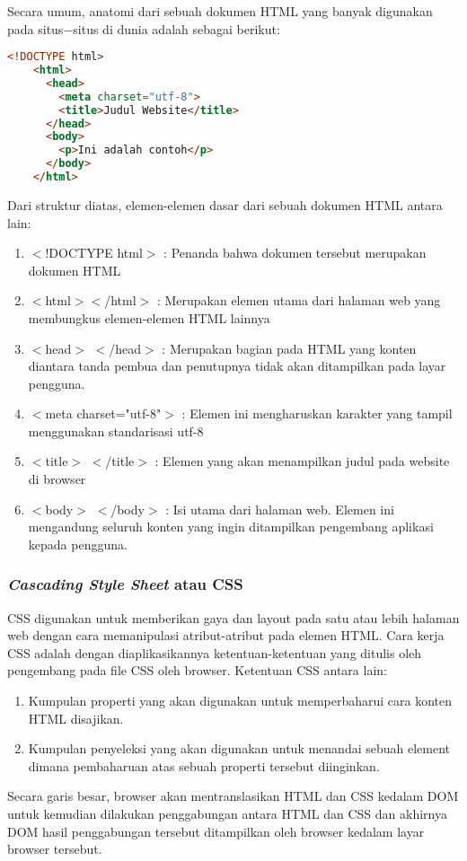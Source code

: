 \documentclass[pi.tex]{subfile}
\begin{document}
\hspace{10pt}Secara umum, anatomi dari sebuah dokumen HTML yang banyak digunakan pada situs$-$situs di dunia adalah sebagai berikut:\\
  \begin{lstlisting}[language=HTML]
    <!DOCTYPE html>
    <html>
      <head>
        <meta charset="utf-8">
        <title>Judul Website</title>
      </head>
      <body>
        <p>Ini adalah contoh</p>
      </body>
    </html>
  \end{lstlisting}
Dari struktur diatas, elemen-elemen dasar dari sebuah dokumen HTML antara lain:
\begin{enumerate}[leftmargin=1.65cm]
\item $<$!DOCTYPE html$>$ : Penanda bahwa dokumen tersebut merupakan dokumen HTML
\item $<$html$>$$<$/html$>$ : Merupakan elemen utama dari halaman web yang membungkus elemen-elemen HTML lainnya
\item $<$head$>$ $<$/head$>$ : Merupakan bagian pada HTML yang konten diantara tanda pembua dan penutupnya tidak akan ditampilkan pada layar pengguna.
\item $<$meta charset="utf-8"$>$ : Elemen ini mengharuskan karakter yang tampil menggunakan standarisasi utf-8
\item $<$title$>$ $<$/title$>$ : Elemen yang akan menampilkan judul pada website di browser
  \item $<$body$>$ $<$/body$>$ : Isi utama dari halaman web. Elemen ini mengandung seluruh konten yang ingin ditampilkan pengembang aplikasi kepada pengguna.
\end{enumerate}

\subsubsection{\emph{Cascading Style Sheet} atau CSS}\hspace{10pt}
CSS digunakan untuk memberikan gaya dan layout pada satu atau lebih halaman web dengan cara memanipulasi atribut-atribut pada elemen HTML. Cara kerja CSS adalah dengan diaplikasikannya ketentuan-ketentuan yang ditulis oleh pengembang pada file CSS oleh browser. Ketentuan CSS antara lain:
\begin{enumerate}[leftmargin=1.65cm]
\item Kumpulan properti yang akan digunakan untuk memperbaharui cara konten HTML disajikan.
\item Kumpulan penyeleksi yang akan digunakan untuk menandai sebuah element dimana pembaharuan atas sebuah properti tersebut diinginkan.
\end{enumerate}
Secara garis besar, browser akan mentranslasikan HTML dan CSS kedalam DOM untuk kemudian dilakukan penggabungan antara HTML dan CSS dan akhirnya DOM hasil penggabungan tersebut ditampilkan oleh browser kedalam layar browser tersebut.
\end{document}
